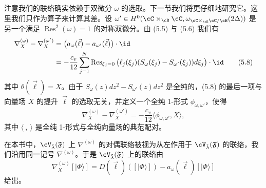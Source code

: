 注意我们的联络确实依赖于双微分 $\omega$ 的选取。下一节我们将更仔细地研究它。这里我们只作为算子来计算其差。设 $\omega'\in H^0(\cC\times_\cB\cC,\omega_{\cC\times_\cB\cC/\cB}(2\Delta))$ 是另一个满足 $\operatorname{Res}^2(\omega)=1$ 的对称双微分。由 (5.5) 与 (5.6) 我们有
\begin{align}
 \nabla^{(\omega)}_X-\nabla^{(\omega')}_X
 &=\big(a_\omega(\vec\ell)-a_{\omega'}(\vec\ell)\big)\cdot\id \nonumber\\
 &=-\frac{c_v}{12}\sum_{j=1}^{N}\operatorname{Res}_{\xi_j=0}
 \big(\ell_j(\xi_j)(S_\omega(\xi_j)-S_{\omega'}(\xi_j))d\xi_j\big)\cdot\id \tag{5.8}
\end{align}
其中 $\theta(\vec\ell)=X$。由于 $S_\omega(z)dz^2-S_{\omega'}(z)dz^2$ 是全纯的，(5.8) 的最后一项与向量场 $X$ 的提升 $\vec\ell$ 的选取无关，并定义一个全纯 1-形式 $\phi_{\omega,\omega'}$，使得
\begin{equation}
 \nabla^{(\omega)}_X-\nabla^{(\omega')}_X=-\frac{c_v}{12}\langle\phi_{\omega,\omega'},X\rangle, \tag{5.9}
\end{equation}
其中 $\langle\ ,\ \rangle$ 是全纯 1-形式与全纯向量场的典范配对。

在本书中，$\cV_{\tilde\lambda}(\mathfrak F)$ 上 $\nabla^{(\omega)}$ 的对偶联络被视为从左作用于 $\cV_{\tilde\lambda}(\mathfrak F)$ 的联络，我们沿用同一记号 $\nabla^{(\omega)}$。于是 $\cV_{\tilde\lambda}(\mathfrak F)$ 上的联络由
\begin{equation}
 \nabla^{(\omega)}_X[|\Phi\rangle]=D(\vec\ell)([|\Phi\rangle])-a_\omega(\vec\ell)[|\Phi\rangle] \tag{5.10}
\end{equation}
给出。



